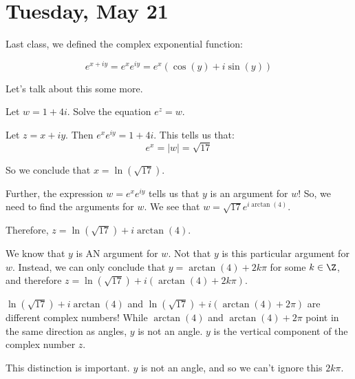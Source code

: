 \section{Tuesday, May 21}


Last class, we defined the complex exponential function:

$$e^{x+iy} = e^xe^{iy} = e^x(\cos(y) + i\sin(y))$$

Let's talk about this some more.

\begin{ex}{}{} Let $w = 1 + 4i$. Solve the equation $e^z = w$.

Let $z = x + iy$. Then $e^xe^{iy} = 1+ 4i$. This tells us that:
$$e^x = |w| = \sqrt{17}$$

So we conclude that $x = \ln(\sqrt{17})$.

Further, the expression $w = e^xe^{iy}$ tells us that $y$ is an argument for $w$! So, we need to find the arguments for $w$. We see that $w = \sqrt{17}e^{i\arctan(4)}$.

Therefore, $z = \ln(\sqrt{17}) + i\arctan(4)$.


 We know that $y$ is AN argument for $w$. Not that $y$ is this particular argument for $w$. Instead, we can only conclude that $y = \arctan(4) + 2k\pi$ for some $k\in \Z$, and therefore $z = \ln(\sqrt{17}) + i(\arctan(4) + 2k\pi)$.
\end{ex}

\begin{note} $\ln(\sqrt{17}) + i\arctan(4)$ and $\ln(\sqrt{17}) + i(\arctan(4) + 2\pi)$ are different complex numbers! While $\arctan(4)$ and $\arctan(4) + 2\pi$ point in the same direction as angles, $y$ is not an angle. $y$ is the vertical component of the complex number $z$.

This distinction is important. $y$ is not an angle, and so we can't ignore this $2k\pi$.\end{note}

